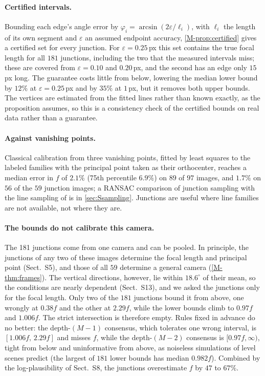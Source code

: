 \paragraph{Certified intervals.} Bounding each edge's angle error by $\varphi_i=\arcsin(2\varepsilon/\ell_i)$, with $\ell_i$ the length of its own segment and $\varepsilon$ an assumed endpoint accuracy, \cref{M-prop:certified} gives a certified set for every junction. For $\varepsilon=0.25$\,px this set contains the true focal length for all $181$ junctions, including the two that the measured intervals miss; these are covered from $\varepsilon=0.10$ and $0.20$\,px, and the second has an edge only $15$\,px long. The guarantee costs little from below, lowering the median lower bound by $12\%$ at $\varepsilon=0.25$\,px and by $35\%$ at $1$\,px, but it removes both upper bounds. The vertices are estimated from the fitted lines rather than known exactly, as the proposition assumes, so this is a consistency check of the certified bounds on real data rather than a guarantee.

\paragraph{Against vanishing points.} Classical calibration from three vanishing points, fitted by least squares to the labeled families with the principal point taken as their orthocenter, reaches a median error in $f$ of $2.1\%$ (75th percentile $6.9\%$) on $89$ of $97$ images, and $1.7\%$ on $56$ of the $59$ junction images; a RANSAC comparison of junction sampling with the line sampling of \citet{wildenauer2012} is in \cref{sec:Ssampling}. Junctions are useful where line families are not available, not where they are.

\paragraph{The bounds do not calibrate this camera.} The 181 junctions come from one camera and can be pooled. In principle, the junctions of any two of these images determine the focal length and principal point (Sect.~S5), and those of all $59$ determine a general camera (\cref{M-thm:frames}). The vertical directions, however, lie within $18.6^\circ$ of their mean, so the conditions are nearly dependent (Sect.~S13), and we asked the junctions only for the focal length. Only two of the $181$ junctions bound it from above, one wrongly at $0.38f$ and the other at $2.29f$, while the lower bounds climb to $0.97f$ and $1.006f$. The strict intersection is therefore empty. Rules fixed in advance do no better: the depth-$(M-1)$ consensus, which tolerates one wrong interval, is $[1.006f,\,2.29f]$ and misses $f$, while the depth-$(M-2)$ consensus is $[0.97f,\infty)$, tight from below and uninformative from above, as noiseless simulations of level scenes predict (the largest of $181$ lower bounds has median $0.982f$). Combined by the log-plausibility of Sect.~S8, the junctions overestimate $f$ by $47$ to $67\%$.

